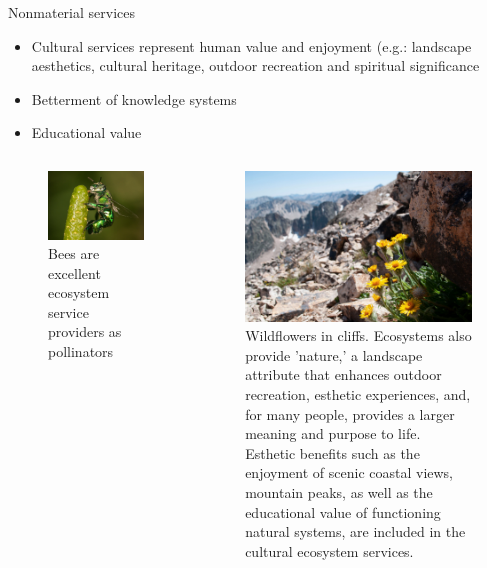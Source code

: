 \documentclass[
  ignorenonframetext,
  aspectratio=169]{beamer}
\providecommand{\tightlist}{%
  \setlength{\itemsep}{0pt}\setlength{\parskip}{0pt}}
\begin{document}
\begin{frame}{Nonmaterial services}
\protect\hypertarget{nonmaterial-services}{}
\footnotesize

\begin{itemize}
\tightlist
\item
  Cultural services represent human value and enjoyment (e.g.: landscape
  aesthetics, cultural heritage, outdoor recreation and spiritual
  significance
\item
  Betterment of knowledge systems
\item
  Educational value
\end{itemize}

\begin{columns}[T,totalwidth=\textwidth]


\begin{figure}
\includegraphics[width=0.9\linewidth]{./../images/twttr/bee_D8bkT-lUEAMzS8c} \caption{Bees are excellent ecosystem service providers as pollinators}\label{fig:pollinator-bees}
\end{figure}


\begin{figure}
\includegraphics[width=0.6\linewidth]{./../images/twttr/wildflower_cliff_D_OOw-NXoAEuyIO} \caption{Wildflowers in cliffs. Ecosystems also provide 'nature,' a landscape attribute that enhances outdoor recreation, esthetic experiences, and, for many people, provides a larger meaning and purpose to life. Esthetic benefits such as the enjoyment of scenic coastal views, mountain peaks, as well as the educational value of functioning natural systems, are included in the cultural ecosystem services.}\label{fig:landscape-diversity}
\end{figure}


\end{columns}
\end{frame}
\end{document}

